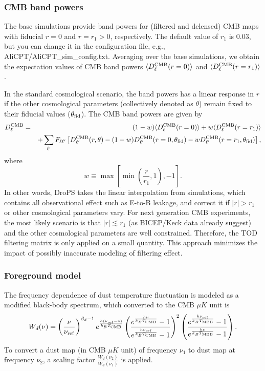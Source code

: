 \documentclass[12pt, a4paper]{ctexart} %
\begin{document}
\subsubsection{CMB band powers}

The base simulations provide band powers for (filtered and delensed) CMB maps with fiducial $r=0$ and $r=r_1>0$, respectively. The default value of $r_1$ is $0.03$, but you can change it in the configuration file, e.g., AliCPT/AliCPT\_sim\_config.txt. Averaging over the base simulations, we obtain the expectation values of CMB band powers $\langle D^{\rm CMB}_\ell(r=0)\rangle $ and $\langle D^{\rm CMB}_\ell(r=r_1)\rangle$.

In the standard cosmological scenario, the band powers has a linear response in $r$ if the other cosmological parameters  (collectively denoted as $\theta$) remain fixed to their fiducial values ($\theta_{\rm fid}$). The CMB band powers are given by
\begin{eqnarray}
  D^{\rm CMB}_\ell &=&  (1-w) \langle D^{\rm CMB}_\ell(r=0)\rangle  + w\langle D^{\rm CMB}_\ell(r=r_1) \rangle \\
  && +\sum_{\ell^\prime} F_{\ell \ell^\prime}\left[D^{\rm CMB}_{\ell^\prime}(r, \theta) - (1-w)D_{\ell^\prime}^{\rm CMB}(r=0, \theta_{\rm fid})- wD_{\ell^\prime }^{\rm CMB}(r=r_1, \theta_{\rm fid})\right],
\end{eqnarray}
where
\begin{equation}
  w \equiv \max\left[\min\left(\frac{r}{r_1}, 1\right), -1\right].
\end{equation}
In other words, DroPS takes the linear interpolation from simulations, which contains all observational effect such as E-to-B leakage, and correct it if $|r|>r_1$ or other cosmological parameters vary. For next generation CMB experiments, the most likely scenario is that $|r|\lesssim r_1$ (as BICEP/Keck data already suggest) and the other cosmological parameters are well constrained. Therefore, the TOD filtering matrix is only applied on a small quantity. This approach minimizes the impact of possibly inaccurate modeling of filtering effect.


\subsubsection{Foreground model}

The frequency dependence of dust temperature fluctuation is modeled as a modified black-body spectrum, which converted to the CMB $\mu K$ unit is
\begin{equation}
  W_d(\nu) = \left(\frac{\nu}{\nu_{\rm ref}}\right)^{\beta_d-1}e^{\frac{h(\nu_{\rm ref} - \nu)}{k_BT_{\rm CMB}}}\left(\frac{e^{\frac{h\nu}{k_BT_{\rm CMB}}}-1}{e^{\frac{h\nu_{\rm ref}}{k_BT_{\rm CMB}}}-1}\right)^2 \left(\frac{e^{\frac{h\nu_{\rm ref}}{k_BT_{\rm MBB}}}-1}{e^{\frac{h\nu}{k_BT_{\rm MBB}}}-1}\right). \label{eq:dust_w}
\end{equation}
To convert a dust map (in CMB $\mu K$ unit) of frequency $\nu_1$ to dust map at frequency $\nu_2$, a scaling factor $\frac{W_d(\nu_2)}{W_d(\nu_1)}$ is applied.
\end{document}
